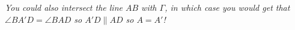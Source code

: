 \documentclass[11pt]{scrartcl}
\begin{document}
\begin{enumerate}[label=\textbf{G\arabic*}.]
\begin{enumerate}[label=(\alph*)]
        \emph{You could also intersect the line $AB$ with $\Gamma$, in which case you would get that $\angle BA'D = \angle BAD$ so $A'D \parallel AD$ so $A = A'$!}
    \end{enumerate}
    
    
\end{enumerate}

\newpage
\end{document}
